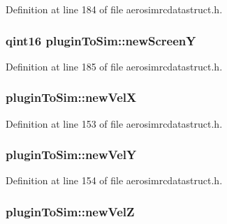 Definition at line 184 of file aerosimrcdatastruct.\-h.

\hypertarget{group___aero_sim_r_c_gad5aa10f7542e0fcf3d4ac3981efc93a2}{
\subsubsection[{new\-Screen\-Y}]{\setlength{\rightskip}{0pt plus 5cm}qint16 plugin\-To\-Sim\-::new\-Screen\-Y}}\label{group___aero_sim_r_c_gad5aa10f7542e0fcf3d4ac3981efc93a2}


Definition at line 185 of file aerosimrcdatastruct.\-h.

\hypertarget{group___aero_sim_r_c_ga963869a7b3f6432a6b42f9f239de0ca8}{
\subsubsection[{new\-Vel\-X}]{ plugin\-To\-Sim\-::new\-Vel\-X}}\label{group___aero_sim_r_c_ga963869a7b3f6432a6b42f9f239de0ca8}


Definition at line 153 of file aerosimrcdatastruct.\-h.

\hypertarget{group___aero_sim_r_c_ga4ef77620e6e374b2af2bbd4e0d88fcfe}{
\subsubsection[{new\-Vel\-Y}]{ plugin\-To\-Sim\-::new\-Vel\-Y}}\label{group___aero_sim_r_c_ga4ef77620e6e374b2af2bbd4e0d88fcfe}


Definition at line 154 of file aerosimrcdatastruct.\-h.

\hypertarget{group___aero_sim_r_c_ga09bc17352168fa2e9b782170e27c7c2b}{
\subsubsection[{new\-Vel\-Z}]{ plugin\-To\-Sim\-::new\-Vel\-Z}}\label{group___aero_sim_r_c_ga09bc17352168fa2e9b782170e27c7c2b}


